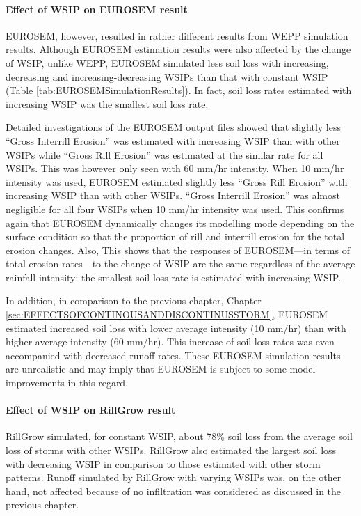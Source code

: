 \paragraph{Effect of WSIP on EUROSEM result} EUROSEM, however, resulted in
rather different results from WEPP simulation results. Although EUROSEM
estimation results were also affected by the change of WSIP, unlike WEPP,
EUROSEM simulated less soil loss with increasing, decreasing and
increasing-decreasing WSIPs than that with constant WSIP (Table
\ref{tab:EUROSEMSimulationResults}). In fact, soil loss rates estimated with
increasing WSIP was the smallest soil loss rate.

Detailed investigations of the EUROSEM output files showed that slightly less
``Gross Interrill Erosion'' was estimated with increasing WSIP than with other
WSIPs while ``Gross Rill Erosion'' was estimated at the similar rate for all
WSIPs. This was however only seen with 60 mm/hr intensity. When 10 mm/hr
intensity was used, EUROSEM estimated slightly less ``Gross Rill Erosion'' with
increasing WSIP than with other WSIPs. ``Gross Interrill Erosion'' was almost
negligible for all four WSIPs when 10 mm/hr intensity was used. This confirms
again that EUROSEM dynamically changes its modelling mode depending on the
surface condition so that the proportion of rill and interrill erosion for the
total erosion changes. Also, This shows that the responses of EUROSEM---in
terms of total erosion rates---to the change of WSIP are the same regardless of
the average rainfall intensity: the smallest soil loss rate is estimated with
increasing WSIP.

In addition, in comparison to the previous chapter, Chapter
\ref{sec:EFFECTSOFCONTINOUSANDDISCONTINUSSTORM}, EUROSEM estimated increased
soil loss with lower average intensity (10 mm/hr) than with higher average
intensity (60 mm/hr). This increase of soil loss rates was even accompanied with
decreased runoff rates. These EUROSEM simulation results are unrealistic and may
imply that EUROSEM is subject to some model improvements in this regard.

\paragraph{Effect of WSIP on RillGrow result} RillGrow simulated, for constant
WSIP, about 78\% soil loss from the average soil loss of storms with other
WSIPs. RillGrow also estimated the largest soil loss with decreasing WSIP in
comparison to those estimated with other storm patterns. Runoff simulated by
RillGrow with varying WSIPs was, on the other hand, not affected because of no
infiltration was considered as discussed in the previous chapter.

